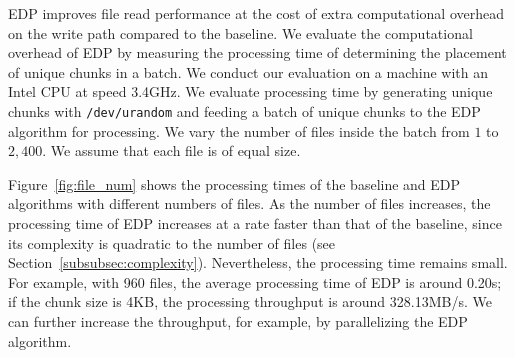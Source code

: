 EDP improves file read performance at the cost of extra computational
overhead on the write path compared to the baseline.  We evaluate the
computational overhead of EDP by measuring the processing time of determining
the placement of unique chunks in a batch.  We conduct our evaluation on a
machine with an Intel CPU at speed 3.4GHz.  We evaluate processing 
time by generating unique chunks with {\tt /dev/urandom} and feeding a batch of 
unique chunks to the EDP algorithm for processing.  We vary the number 
of files inside the batch from $1$ to $2,400$.  We assume that each file is of
equal size. 

Figure~\ref{fig:file_num} shows the processing times of the baseline and EDP
algorithms with different numbers of files.  As the number of files increases,
the processing time of EDP increases at a rate faster than that of the
baseline, since its complexity is quadratic to the number of files (see
Section~\ref{subsubsec:complexity}).  Nevertheless, the processing time
remains small.  For example, with 960 files, the average processing time of
EDP is around 0.20s; if the chunk size is 4KB, the processing throughput is
around 328.13MB/s.  We can further increase the throughput, for example, by
parallelizing the EDP algorithm.


